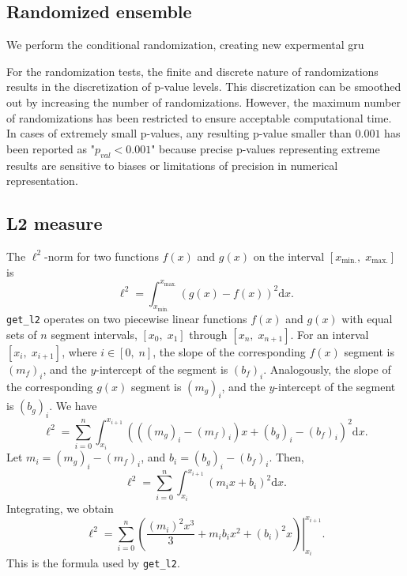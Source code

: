 \documentclass[fleqn,10pt]{wlscirep}
\begin{document}
\subsection{Randomized ensemble}
We perform the conditional randomization, creating new expermental gru

For the randomization tests, the finite and discrete nature of randomizations results in the discretization of p-value levels. This discretization can be smoothed out by increasing the number of randomizations. However, the maximum number of randomizations has been restricted to ensure acceptable computational time. In cases of extremely small p-values, any resulting p-value smaller than $0.001$ has been reported as "$p_{val}<0.001$" because precise p-values representing extreme results are sensitive to biases or limitations of precision in numerical representation.

\subsection{L2 measure}

The $\ell^2$-norm for two functions $f\left(x\right)$ and $g\left(x\right)$ on the interval
$\left[x_\text{min.},\;x_\text{max.}\right]$ is
\[\ell^2=\int_{x_\text{min.}}^{x_\text{max.}}\left(g\left(x\right)-f\left(x\right)\right)^2\text{d}x.\] \texttt{get\_l2}
operates on two piecewise linear functions $f\left(x\right)$ and $g\left(x\right)$ with equal sets of $n$ segment
intervals, $\left[x_0,\;x_1\right]$ through $\left[x_n,\;x_{n+1}\right]$. For an interval $\left[x_i,\;x_{i+1}\right]$,
where $i\in\left[0,\;n\right]$, the slope of the corresponding $f\left(x\right)$ segment is $\left(m_f\right)_i$, and
the $y$-intercept of the segment is $\left(b_f\right)_i$. Analogously, the slope of the corresponding $g\left(x\right)$
segment is $\left(m_g\right)_i$, and the $y$-intercept of the segment is $\left(b_g\right)_i$. We have
\[\ell^2=\sum_{i=0}^n\int_{x_i}^{x_{i+1}}\left(\left(\left(m_g\right)_i-\left(m_f\right)_i\right)x+\left(b_g\right)_i-\left(b_f\right)_i\right)^2\text{d}x.\]
Let $m_i=\left(m_g\right)_i-\left(m_f\right)_i$, and $b_i=\left(b_g\right)_i-\left(b_f\right)_i$. Then,
\[\ell^2=\sum_{i=0}^n\int_{x_i}^{x_{i+1}}\left(m_i x+b_i\right)^2\text{d}x.\] Integrating, we obtain
\[\ell^2 =\sum_{i=0}^{n}\left.\left(\frac{\left(m_i\right)^2x^3}{3}+m_ib_ix^2+\left(b_i\right)^2x\right)\right|_{x_i}^{x_{i+1}}.\]
This is the formula used by \texttt{get\_l2}.
\end{document}
